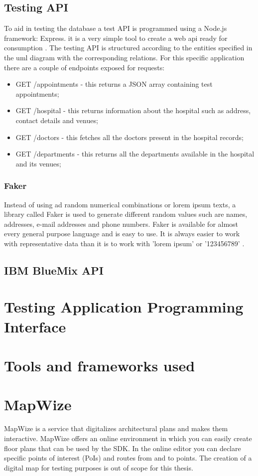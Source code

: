 \subsection{Testing API}
To aid in testing the database a test API is programmed using a Node.js framework: Express. it is a very simple tool to create a web \acrshort{api} ready for consumption \cite{Express2019}. The testing API is structured according to the entities specified in the \acrshort{uml} diagram with the corresponding relations. For this specific application there are a couple of endpoints exposed for requests:
\begin{itemize}
\item GET /appointments - this returns a JSON array containing test appointments;
\item GET /hospital - this returns information about the hospital such as address, contact details and venues;
\item GET /doctors - this fetches all the doctors present in the hospital records;
\item GET /departments - this returns all the departments available in the hospital and its venues;
\end{itemize}
\subsubsection{Faker}
Instead of using ad random numerical combinations or lorem ipsum texts, a library called Faker is used to generate different random values such are names, addresses, e-mail addresses and phone numbers. Faker is available for almost every general purpose language and is easy to use. It is always easier to work with representative data than it is to work with 'lorem ipsum' or '123456789' \cite{DanieleFaraglia2014}.
\subsection{IBM BlueMix API}
\section{Testing Application Programming Interface}
\section{Tools and frameworks used}
\section{MapWize}
MapWize is a service that digitalizes architectural plans and makes them interactive. MapWize offers an online environment in which you can easily create floor plans that can be used by the SDK. In the online editor you can declare specific points of interest (PoIs) and routes from and to points. The creation of a digital map for testing purposes is out of scope for this thesis. 
